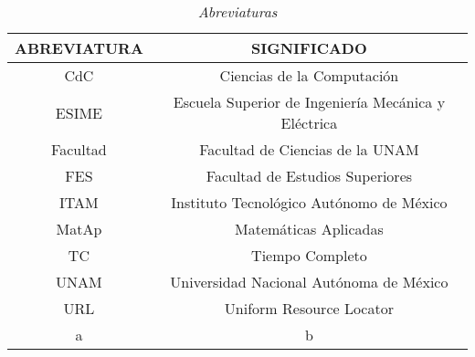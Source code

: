 \begin{appendices}
\begin{table}[H]
\centering
\begin{tabular}{|c|c|}
\hline 
 ABREVIATURA & SIGNIFICADO \\ 
\hline 
 CdC & Ciencias de la Computación \\ 
\hline 
 ESIME & Escuela Superior de Ingeniería Mecánica y Eléctrica\\ 
\hline 
 Facultad & Facultad de Ciencias de la UNAM \\ 
\hline 
 FES & Facultad de Estudios Superiores \\
\hline 
 ITAM & Instituto Tecnológico Autónomo de México \\ 
\hline 
 MatAp & Matemáticas Aplicadas \\ 
\hline 
 TC & Tiempo Completo \\ 
\hline 
 UNAM & Universidad Nacional Autónoma de México \\ 
\hline 
 URL & Uniform Resource Locator \\ 
\hline 
 a & b \\ 
\hline 
\end{tabular} 
\caption{\textit{Abreviaturas}}
\end{table}
\end{appendices}





